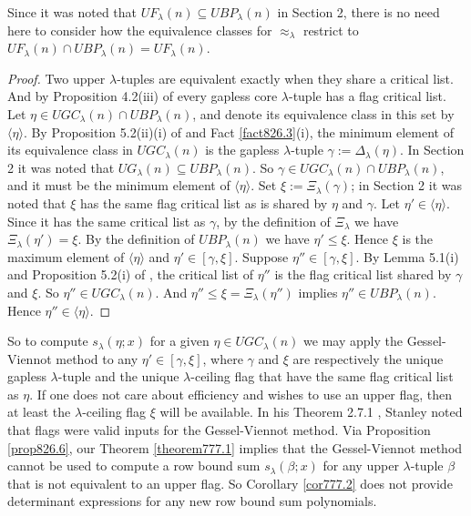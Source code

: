 \documentclass[11pt]{article}
\theoremstyle{definition}
\theoremstyle{remark}
\numberwithin{equation}{section}
\begin{document}
\begin{spacing}{1.35}
\noindent Since it was noted that $UF_\lambda(n) \subseteq UBP_\lambda(n)$ in Section 2, there is no need here to consider how the equivalence classes for $\approx_\lambda$ restrict to $UF_\lambda(n) \cap UBP_\lambda(n) = UF_\lambda(n)$.

\begin{proof}Two upper $\lambda$-tuples are equivalent exactly when they share a critical list.  And by Proposition 4.2(iii) of \cite{PW} every gapless core $\lambda$-tuple has a flag critical list.  Let $\eta \in UGC_\lambda(n) \cap UBP_\lambda(n)$, and denote its equivalence class in this set by $\langle \eta \rangle$.  By Proposition 5.2(ii)(i) of \cite{PW} and Fact \ref{fact826.3}(i), the minimum element of its equivalence class in $UGC_\lambda(n)$ is the gapless $\lambda$-tuple $\gamma := \Delta_\lambda(\eta)$.  In Section 2 it was noted that $UG_\lambda(n) \subseteq UBP_\lambda(n)$.  So $\gamma \in UGC_\lambda(n) \cap UBP_\lambda(n)$, and it must be the minimum element of $\langle \eta \rangle$.  Set $\xi := \Xi_\lambda(\gamma)$;  in Section 2 it was noted that $\xi$ has the same flag critical list as is shared by $\eta$ and $\gamma$.  Let $\eta' \in \langle \eta \rangle$.  Since it has the same critical list as $\gamma$, by the definition of $\Xi_\lambda$ we have $\Xi_\lambda(\eta') = \xi$.  By the definition of $UBP_\lambda(n)$ we have $\eta' \leq \xi$.  Hence $\xi$ is the maximum element of $\langle \eta \rangle$ and $\eta' \in [\gamma, \xi]$.  Suppose $\eta'' \in [\gamma, \xi]$.  By Lemma 5.1(i) and Proposition 5.2(i) of \cite{PW}, the critical list of $\eta''$ is the flag critical list shared by $\gamma$ and $\xi$.  So $\eta'' \in UGC_\lambda(n)$.  And $\eta'' \leq \xi = \Xi_\lambda(\eta'')$ implies $\eta'' \in UBP_\lambda(n)$.  Hence $\eta'' \in \langle \eta \rangle$. \end{proof}

\noindent So to compute $s_\lambda(\eta;x)$ for a given $\eta \in UGC_\lambda(n)$ we may apply the Gessel-Viennot method to any $\eta' \in [\gamma, \xi]$, where $\gamma$ and $\xi$ are respectively the unique gapless $\lambda$-tuple and the unique $\lambda$-ceiling flag that have the same flag critical list as $\eta$.  If one does not care about efficiency and wishes to use an upper flag, then at least the $\lambda$-ceiling flag $\xi$ will be available.  In his Theorem 2.7.1 \cite{St1}, Stanley noted that flags were valid inputs for the Gessel-Viennot method.  Via Proposition \ref{prop826.6}, our Theorem \ref{theorem777.1} implies that the Gessel-Viennot method cannot be used to compute a row bound sum $s_\lambda(\beta;x)$ for any upper $\lambda$-tuple $\beta$ that is not equivalent to an upper flag.  So Corollary \ref{cor777.2} does not provide determinant expressions for any new row bound sum polynomials.






\end{spacing}
\end{document}
